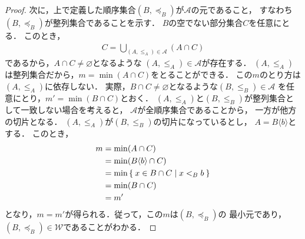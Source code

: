 \begin{proof}
     次に，上で定義した順序集合$(B, {\preceq_B})$が$\mathscr{A}$の元であること，
     すなわち$(B, { \preceq _B})$が整列集合であることを示す．
     $B$の空でない部分集合$C$を任意にとる．
     このとき，
     \begin{align*}
       C = \bigcup_{(A, {\leq_A}) \in  \mathscr{A}} (A \cap C) 
     \end{align*}
     であるから，$A \cap C  \neq \varnothing$となるような
     $(A , {\leq_A}) \in \mathscr{A}$が存在する．
     $(A, {\leq_A})$は整列集合だから，$m = \min ( A \cap C )$をとることができる．
     この$m$のとり方は$(A , {\leq_A})$に依存しない．
     実際，$B \cap C \neq \varnothing$となるような$(B ,{\leq_B}) \in \mathscr{A}$
     を任意にとり，$m' = \min ( B \cap C)$とおく．
     $(A, {\leq_A})$と$(B , {\leq_B})$が整列集合として一致しない場合を考えると，
     $\mathscr{A}$が全順序集合であることから，
     一方が他方の切片となる．
     $(A, {\leq_A})$が$( B , {\leq_B})$の切片になっているとし，
     $A= B \langle b \rangle$とする．
     このとき，
     \begin{align*}
       m & = \min (A \cap C) \\
         & = \min (B \langle b \rangle \cap C) \\
         & = \min \Set{ x \in B \cap C \mid x <_B b } \\
         & = \min (B \cap C) \\
         & = m'
     \end{align*}
     となり，$m=m'$が得られる．従って，この$m$は$(B , {\preceq_B})$の
     最小元であり，$(B, {\preceq_B}) \in \mathscr{W}$であることがわかる．


\end{proof}
